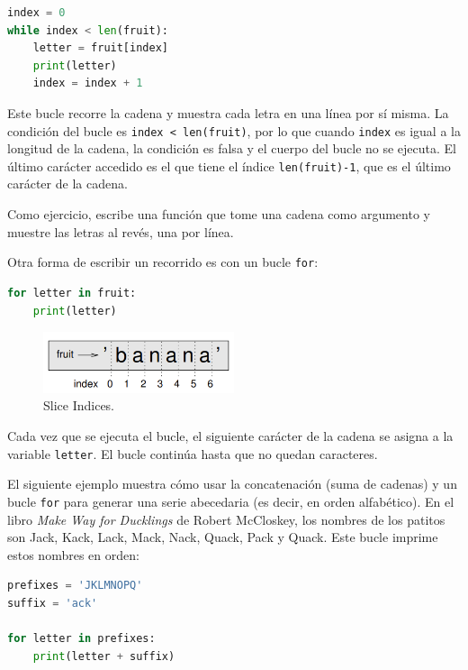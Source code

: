 \begin{lstlisting}[language=Python]
index = 0
while index < len(fruit):
    letter = fruit[index]
    print(letter)
    index = index + 1
\end{lstlisting}

Este bucle recorre la cadena y muestra cada letra en una línea por sí misma. La condición del bucle es \texttt{index < len(fruit)}, por lo que cuando \texttt{index} es igual a la longitud de la cadena, la condición es falsa y el cuerpo del bucle no se ejecuta. El último carácter accedido es el que tiene el índice \texttt{len(fruit)-1}, que es el último carácter de la cadena.

Como ejercicio, escribe una función que tome una cadena como argumento y muestre las letras al revés, una por línea.

Otra forma de escribir un recorrido es con un bucle \texttt{for}:

\begin{lstlisting}[language=Python]
for letter in fruit:
    print(letter)
\end{lstlisting}

\begin{figure}[h]
        \centering
        \includegraphics[width=0.5\textwidth]{./images/chapter_8_1.png}
        \caption{Slice Indices.}
        \label{fig:8_1}
        \end{figure}
Cada vez que se ejecuta el bucle, el siguiente carácter de la cadena se asigna a la variable \texttt{letter}. El bucle continúa hasta que no quedan caracteres.

El siguiente ejemplo muestra cómo usar la concatenación (suma de cadenas) y un bucle \texttt{for} para generar una serie abecedaria (es decir, en orden alfabético). En el libro \textit{Make Way for Ducklings} de Robert McCloskey, los nombres de los patitos son Jack, Kack, Lack, Mack, Nack, Quack, Pack y Quack. Este bucle imprime estos nombres en orden:

\begin{lstlisting}[language=Python]
prefixes = 'JKLMNOPQ'
suffix = 'ack'

for letter in prefixes:
    print(letter + suffix)
\end{lstlisting}


